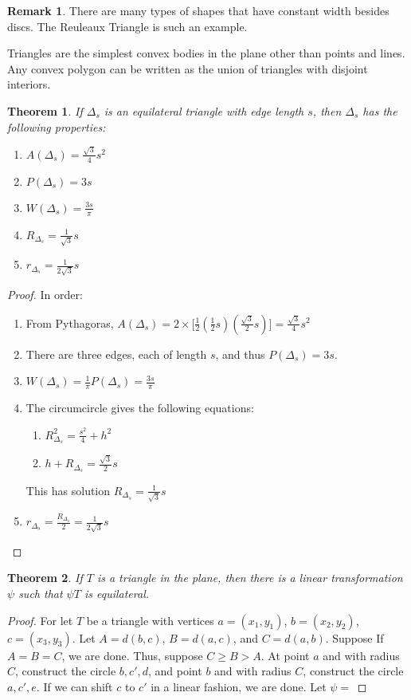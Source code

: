 \documentclass[oneside]{book}
\newtheorem{theorem}{Theorem}[section]
\theoremstyle{definition}
\newtheorem{remark}{Remark}[section]
\begin{document}
\begin{remark}
There are many types of shapes that have constant width besides discs. The Reuleaux Triangle is such an example.
\end{remark}

Triangles are the simplest convex bodies in the plane other than points and lines. Any convex polygon can be written as the union of triangles with disjoint interiors. 

\begin{paracol}{2}
\begin{theorem}
If $\Delta_s$ is an equilateral triangle with edge length $s$, then $\Delta_s$ has the following properties:
\begin{enumerate}
\item $A(\Delta_s) = \frac{\sqrt{3}}{4}s^2$
\item $P(\Delta_s) = 3s$
\item $W(\Delta_s) = \frac{3s}{\pi}$
\item $R_{\Delta_s} = \frac{1}{\sqrt{3}}s $
\item $r_{\Delta_s} = \frac{1}{2\sqrt{3}}s $
\end{enumerate}
\end{theorem}
\switchcolumn
\begin{proof}
In order:
\begin{enumerate}
\item From Pythagoras, $A(\Delta_s) =2\times\big[\frac{1}{2}(\frac{1}{2}s)(\frac{\sqrt{3}}{2}s)\big] = \frac{\sqrt{3}}{4}s^2$
\item There are three edges, each of length $s$, and thus $P(\Delta_s) = 3s$.
\item $W(\Delta_s) = \frac{1}{\pi}P(\Delta_s) = \frac{3s}{\pi}$
\item The circumcircle gives the following equations:
\begin{enumerate}
\item $R_{\Delta_s}^2=\frac{s^2}{4}+h^2$
\item $h+R_{\Delta_s} = \frac{\sqrt{3}}{2}s$
\end{enumerate}
This has solution $R_{\Delta_s}=\frac{1}{\sqrt{3}}s$
\item $r_{\Delta_s} = \frac{R_{\Delta_s}}{2}= \frac{1}{2\sqrt{3}}s$
\end{enumerate}
\end{proof}
\end{paracol}

\begin{theorem}
If $T$ is a triangle in the plane, then there is a linear transformation $\psi$ such that $\psi T$ is equilateral.
\end{theorem}
\begin{proof}
For let $T$ be a triangle with vertices $a=(x_1,y_1)$, $b=(x_2,y_2)$, $c=(x_3,y_3)$. Let $A = d(b,c)$, $B=d(a,c)$, and $C=d(a,b)$. Suppose If $A=B=C$, we are done. Thus, suppose $C\geq B >A$. At point $a$ and with radius $C$, construct the circle $b,c',d$, and point $b$ and with radius $C$, construct the circle $a,c',e$. If we can shift $c$ to $c'$ in a linear fashion, we are done. Let $\psi =$
\end{proof} 
\end{document}
